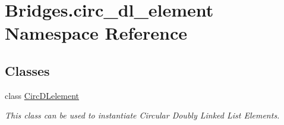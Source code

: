 \hypertarget{namespace_bridges_1_1circ__dl__element}{}\section{Bridges.\+circ\+\_\+dl\+\_\+element Namespace Reference}
\label{namespace_bridges_1_1circ__dl__element}
\subsection*{Classes}
\begin{DoxyCompactItemize}
\item 
class \mbox{\hyperlink{class_bridges_1_1circ__dl__element_1_1_circ_d_lelement}{Circ\+D\+Lelement}}
\begin{DoxyCompactList}\small\item\em This class can be used to instantiate Circular Doubly Linked List Elements. \end{DoxyCompactList}\end{DoxyCompactItemize}
